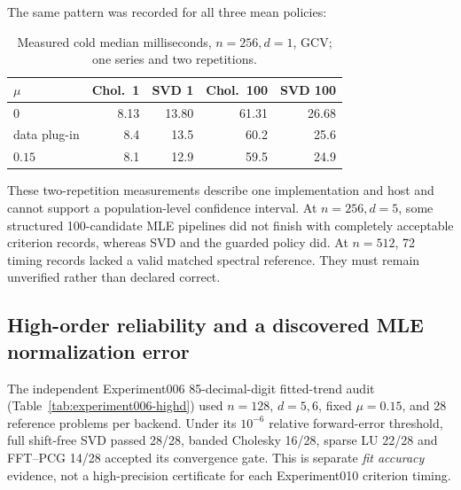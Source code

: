 The same pattern was recorded for all three mean policies:
\begin{table}[t]\centering
\caption{Measured cold median milliseconds, $n=256,d=1$,
GCV; one series and two repetitions.}
\label{tab:experiment010_mean}
\setlength{\tabcolsep}{3pt}
\begin{tabular}{@{}lrrrr@{}}
\toprule
$\mu$ & Chol.\ 1 & SVD 1 & Chol.\ 100 & SVD 100\\
\midrule
$0$ & 8.13 & 13.80 & 61.31 & 26.68\\
data plug-in & 8.4 & 13.5 & 60.2 & 25.6\\
$0.15$ & 8.1 & 12.9 & 59.5 & 24.9\\
\bottomrule
\end{tabular}
\end{table}
These two-repetition measurements describe one implementation
and host and cannot support a population-level confidence interval.
At $n=256,d=5$, some structured 100-candidate MLE pipelines
did not finish with completely acceptable criterion records,
whereas SVD and the guarded policy did. At $n=512$, 72 timing
records lacked a valid matched spectral reference.
They must remain unverified rather than declared correct.

\subsection{High-order reliability and a discovered MLE normalization error}
The independent Experiment006 85-decimal-digit fitted-trend audit
(Table~\ref{tab:experiment006-highd}) used $n=128$, $d=5,6$,
fixed $\mu=0.15$, and 28 reference problems per backend.
Under its $10^{-6}$ relative forward-error threshold, full
shift-free SVD passed 28/28, banded Cholesky 16/28, sparse LU
22/28 and FFT--PCG 14/28 accepted its convergence gate.
This is separate \emph{fit accuracy} evidence, not a high-precision
certificate for each Experiment010 criterion timing.

